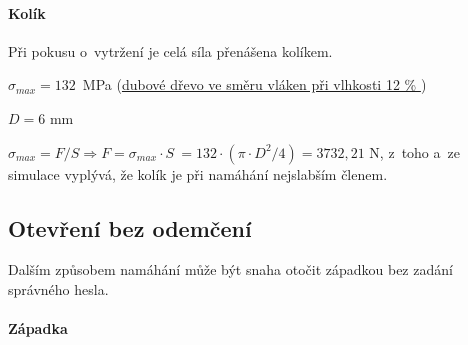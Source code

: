 \begin{table}[h]
    \centering
    \caption{Tabulka značení veličin pro napětí v~kolíku v~tahu}
    \label{tab:M3_symboly_kolik}
\end{table}

\paragraph*{Kolík}
Při pokusu o~vytržení je celá síla přenášena kolíkem.

\noindent $ \sigma_{max} = 132  $~MPa (\href{https://is.mendelu.cz/eknihovna/opory/zobraz_cast.pl?fit_w=1;cast=9190}{dubové dřevo ve směru vláken při vlhkosti 12 \% }\parencite{pevnost}) %

\noindent $D = 6$ mm

\noindent \(\sigma_{max} = F/S \Rightarrow F = \sigma_{max} \cdot S~= 132 \cdot (\pi \cdot D^2/4) = 3 732,21 \) N,  z~toho a~ze simulace vyplývá, že kolík je při namáhání nejslabším členem.

\subsection*{Otevření bez odemčení}


Dalším způsobem namáhání může být snaha otočit západkou bez zadání správného hesla.

\paragraph*{Západka}

